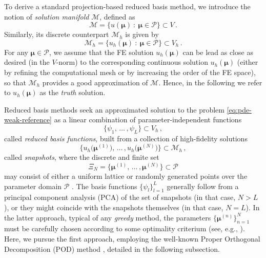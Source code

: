 \documentclass{elsarticle}
\theoremstyle{theorem}
\theoremstyle{definition}
\theoremstyle{remark}
\theoremstyle{proposition}
\numberwithin{figure}{section}
\newcommand{\bg}[1]{\boldsymbol{#1}}
\begin{document}
		To derive a standard projection-based reduced basis method, we introduce the notion of \emph{solution manifold} $\mathcal{M}$, defined as
		\begin{equation*}
			\mathcal{M} = \big\lbrace u(\bg{\mu}) ~ : ~ \bg{\mu} \in \mathcal{P} \big\rbrace \subset V \, .
		\end{equation*}
		Similarly, its discrete counterpart $\mathcal{M}_h$ is given by
		\begin{equation*}
			\mathcal{M}_h = \big\lbrace u_h(\bg{\mu}) ~ : ~ \bg{\mu} \in \mathcal{P} \big\rbrace \subset V_h \, .
		\end{equation*}
		For any $\bg{\mu} \in \mathcal{P}$, we assume that the FE solution $u_h(\bg{\mu})$ can be lead as close as desired (in the $V$-norm) to the corresponding continuous solution $u_h(\bg{\mu})$ (either by refining the computational mesh or by increasing the order of the FE space), so that $\mathcal{M}_h$ provides a good approximation of $\mathcal{M}$. Hence, in the following we refer to $u_h(\bg{\mu})$ as the \emph{truth} solution.
				
		Reduced basis methods seek an approximated solution to the problem \eqref{eq:pde-weak-reference} as a linear combination of parameter-independent functions \[ \big\lbrace \psi_1, \, \ldots \, , \psi_L \big\rbrace \subset V_h \, , \] called \emph{reduced basis functions}, built from a collection of high-fidelity solutions \[ \big\lbrace u_h \big( \bg{\mu}^{(1)} \big), \, \ldots \, , u_h \big( \bg{\mu}^{(N)} \big) \big\rbrace \subset \mathcal{M}_h \, , \] called \emph{snapshots}, where the discrete and finite set \[ \Xi_N = \big\lbrace \bg{\mu}^{(1)}, \, \ldots \, , \bg{\mu}^{(N)} \big\rbrace \subset \mathcal{P} \] may consist of either a uniform lattice or randomly generated points over the parameter domain $\mathcal{P}$ \cite{HSR16}. The basis functions $\big\lbrace \psi_l \big\rbrace_{l = 1}^L$ generally follow from a principal component analysis (PCA) of the set of snapshots (in that case, $N > L$), or they might coincide with the snapshots themselves (in that case, $N = L$). In the latter approach, typical of any \emph{greedy} method, the parameters $\big\lbrace \bg{\mu}^{(n)} \big\rbrace_{n = 1}^N$ must be carefully chosen according to some optimality criterium (see, e.g., \cite{Chen17}). Here, we pursue the first approach, employing the well-known Proper Orthogonal Decomposition (POD) method \cite{Vol08}, detailed in the following subsection.
		
\end{document}
